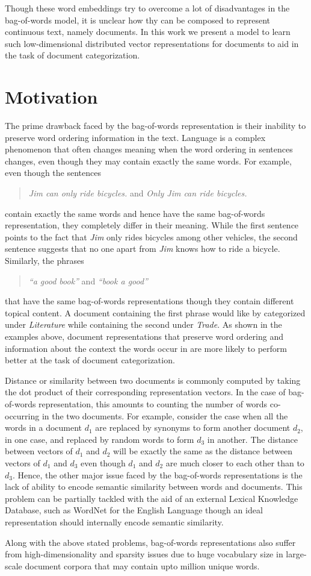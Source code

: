 Though these word embeddings try to overcome a lot of disadvantages in the bag-of-words model, it is unclear how thy can be composed to represent continuous text, namely documents. In this work we present a model to learn such low-dimensional distributed vector representations for documents to aid in the task of document categorization.
 
\section{Motivation}
The prime drawback faced by the bag-of-words representation is their inability to preserve word ordering information in the text. Language is a complex phenomenon that often changes meaning when the word ordering in sentences changes, even though they may contain exactly the same words. For example, even though the sentences
\begin{quote}
\centering
\emph{ 	Jim can only ride bicycles. } and \emph{ 	Only Jim can ride bicycles. }
\end{quote}
contain exactly the same words and hence have the same bag-of-words representation, they completely differ in their meaning. While the first sentence points to the fact that \emph{Jim} only rides bicycles among other vehicles, the second sentence suggests that no one apart from \emph{Jim} knows how to ride a bicycle. 
Similarly, the phrases 
\begin{quote}
\centering
\emph{ 	``a good book'' } and \emph{ 	``book a good'' }
\end{quote}
that have the same bag-of-words representations though they contain different topical content. A document containing the first phrase would like by categorized under \emph{Literature} while containing the second under \emph{Trade}.
As shown in the examples above, document representations that preserve word ordering and information about the context the words occur in are more likely to perform better at the task of document categorization.

Distance or similarity between two documents is commonly computed by taking the dot product of their corresponding representation vectors. In the case of bag-of-words representation, this amounts to counting the number of words co-occurring in the two documents. For example, consider the case when all the words in a document $d_{1}$ are replaced by synonyms to form another document $d_{2}$, in one case, and replaced by random words to form $d_{3}$ in another. The distance between vectors of $d_{1}$ and $d_{2}$ will be exactly the same as the distance between vectors of $d_{1}$ and $d_{3}$ even though $d_{1}$ and $d_{2}$ are much closer to each other than to $d_{3}$. 
Hence, the other major issue faced by the bag-of-words representations is the lack of ability to encode semantic similarity between words and documents. 
This problem can be partially tackled with the aid of an external Lexical Knowledge Database, such as WordNet for the English Language though an ideal representation should internally encode semantic similarity.

Along with the above stated problems, bag-of-words representations also suffer from high-dimensionality and sparsity issues due to huge vocabulary size in large-scale document corpora that may contain upto million unique words.








